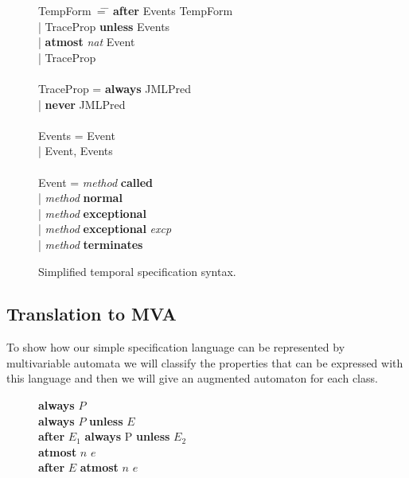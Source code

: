 \documentclass[a4paper,10pt]{article}
\theoremstyle{definition}
\begin{document}
\begin{figure}
\begin{center}
\begin{minipage}{20cm}
\begin{tabbing}
TempForm\, \= = \= \hspace*{3.1pt} \= \textbf{after} Events TempForm \+\+\\
  | TraceProp \textbf{unless} Events\\
  | \textbf{atmost} \textit{nat} Event\\
  | TraceProp \-\-\\
\\
TraceProp \> = \> \> \textbf{always} JMLPred \+\+\\
  | \textbf{never} JMLPred \-\-\\
\\
Events \> = \> \> Event \+\+\\
  | Event, Events \-\-\\
\\
Event \> = \> \> \textit{method} \textbf{called} \+\+\\
  | \textit{method} \textbf{normal}\\
  | \textit{method} \textbf{exceptional}\\
  | \textit{method} \textbf{exceptional} \textit{excp}\\
  | \textit{method} \textbf{terminates}
\end{tabbing} 
\end{minipage}
\end{center}
\caption{Simplified temporal specification syntax.}
\end{figure} 

\subsection*{Translation to MVA}
To show how our simple specification language can be represented by
multivariable automata we will classify the properties that can be expressed
with this language and then we will give an augmented automaton for each class.

\begin{figure}[htbp]
\centering
\begin{minipage}[c]{4.8cm}
\textbf{always} $P$\\
\textbf{always} $P$ \textbf{unless} $E$\\
\textbf{after} $E_1$ \textbf{always} P \textbf{unless} $E_2$\\
\textbf{atmost} $n$ $e$\\
\textbf{after} $E$ \textbf{atmost} $n$ $e$
\end{minipage}
\end{figure}
\end{document}
